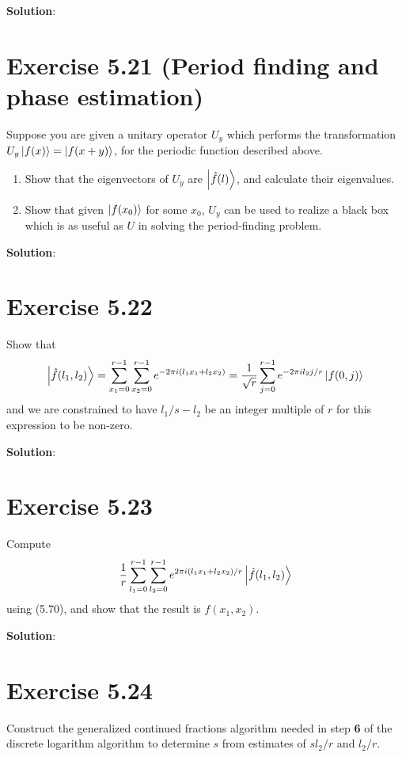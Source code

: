\documentclass{book}
\begin{document}
    \textbf{Solution}:
    
\section*{Exercise 5.21 (Period finding and phase estimation)}
    Suppose you are given a unitary operator $U_y$ which performs the transformation $U_y\ket{f(x)} = \ket{f(x+y)}$, for the periodic function described above.
    \begin{enumerate}
        \item Show that the eigenvectors of $U_y$ are $\ket{\hat{f}(l)}$, and calculate their eigenvalues.
        \item Show that given $\ket{f(x_0)}$ for some $x_0$, $U_y$ can be used to realize a black box which is as useful as $U$ in solving the period-finding problem.
    \end{enumerate}
    
    \textbf{Solution}:
    
\section*{Exercise 5.22}
    Show that
    \begin{align}
        \ket{\hat{f}(l_1,l_2)} = \sum_{x_1=0}^{r-1} \sum_{x_2 = 0}^{r-1}e^{-2\pi i(l_1x_1+l_2x_2)} = \frac{1}{\sqrt{r}} \sum_{j=0}^{r-1}e^{-2\pi i l_2 j /r}\ket{f(0,j)}
    \end{align}
    and we are constrained to have $l_1/s-l_2$ be an integer multiple of $r$ for this expression to be non-zero.
    
    \textbf{Solution}:
    
\section*{Exercise 5.23}
    Compute
    \begin{align}
        \frac{1}{r}\sum_{l_1=0}^{r-1}\sum_{l_2=0}^{r-1} e^{2\pi i (l_1x_1+l_2x_2)/r}\ket{\hat{f}(l_1,l_2)}
    \end{align}
    using (5.70), and show that the result is $f(x_1,x_2)$.
    
    \textbf{Solution}:
    
\section*{Exercise 5.24}
    Construct the generalized continued fractions algorithm needed in step \textbf{6} of the discrete logarithm algorithm to determine $s$ from estimates of $s l_2/r$ and $l_2/r$.
    
\end{document}
